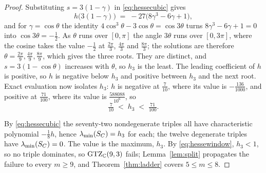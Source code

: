 \begin{proof}
Substituting $s=3(1-\gamma)$ in \eqref{eq:hessecubic} gives
\[
  h\bigl(3(1-\gamma)\bigr)\;=\;-27\bigl(8\gamma^{3}-6\gamma+1\bigr),
\]
and for $\gamma=\cos\theta$ the identity $4\cos^{3}\theta-3\cos\theta
=\cos3\theta$ turns $8\gamma^{3}-6\gamma+1=0$ into
$\cos3\theta=-\tfrac12$.  As $\theta$ runs over $[0,\pi]$ the angle
$3\theta$ runs over $[0,3\pi]$, where the cosine takes the value
$-\tfrac12$ at $\tfrac{2\pi}3$, $\tfrac{4\pi}3$ and $\tfrac{8\pi}3$; the
solutions are therefore
$\theta=\tfrac{2\pi}9,\tfrac{4\pi}9,\tfrac{8\pi}9$, which gives the three
roots.  They are distinct, and $s=3(1-\cos\theta)$ increases with $\theta$,
so $h_3$ is the least.  The leading coefficient of $h$ is positive, so $h$
is negative below $h_3$ and positive between $h_3$ and the next root.
Exact evaluation now isolates $h_3$: $h$ is negative at
$\tfrac7{10}$, where its value is $-\tfrac{136}{1000}$, and positive at
$\tfrac{71}{100}$, where its value is $\tfrac{588088}{10^{6}}$, so
\begin{equation}\label{eq:hessewindow}
  \tfrac7{10}\;<\;h_3\;<\;\tfrac{71}{100}.
\end{equation}

By \eqref{eq:hessecubic} the seventy-two nondegenerate triples all have
characteristic polynomial $-\tfrac18h$, hence
$\lambda_{\min}(S_{C})=h_3$ for each; the twelve degenerate triples have
$\lambda_{\min}(S_{C})=0$.  The value is the maximum, $h_3$.  By
\eqref{eq:hessewindow}, $h_3<1$, so no triple
dominates, so $\mathrm{GTZ}_{\mathbb{C}}(9,3)$ fails; Lemma~\ref{lem:split} propagates the
failure to every $m\ge9$, and Theorem~\ref{thm:ladder} covers
$5\le m\le8$.
\end{proof}

